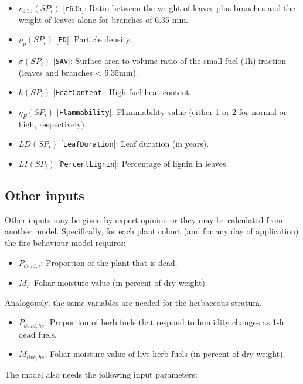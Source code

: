 \documentclass[]{book}
\providecommand{\tightlist}{%
  \setlength{\itemsep}{0pt}\setlength{\parskip}{0pt}}
\begin{document}
\begin{itemize}
\tightlist
\item
  \(r_{6.35}(SP_i)\) {[}\texttt{r635}{]}: Ratio between the weight of
  leaves plus branches and the weight of leaves alone for branches of
  6.35 mm.
\item
  \(\rho_p(SP_i)\) {[}\texttt{PD}{]}: Particle density.
\item
  \(\sigma(SP_i)\) {[}\texttt{SAV}{]}: Surface-area-to-volume ratio of
  the small fuel (1h) fraction (leaves and branches \textless{} 6.35mm).
\item
  \(h(SP_i)\) {[}\texttt{HeatContent}{]}: High fuel heat content.
\item
  \(\eta_{F}(SP_i)\) {[}\texttt{Flammability}{]}: Flammability value
  (either 1 or 2 for normal or high, respectively).
\item
  \(LD(SP_i)\) {[}\texttt{LeafDuration}{]}: Leaf duration (in years).
\item
  \(LI(SP_i)\) {[}\texttt{PercentLignin}{]}: Percentage of lignin in
  leaves.
\end{itemize}

\subsection{Other inputs}\label{other-inputs}

Other inputs may be given by expert opinion or they may be calculated
from another model. Specifically, for each plant cohort (and for any day
of application) the fire behaviour model requires:

\begin{itemize}
\tightlist
\item
  \(P_{dead,i}\): Proportion of the plant that is dead.
\item
  \(M_i\): Foliar moisture value (in percent of dry weight).
\end{itemize}

Analogously, the same variables are needed for the herbaceous stratum.

\begin{itemize}
\tightlist
\item
  \(P_{dead,he}\): Proportion of herb fuels that respond to humidity
  changes as 1-h dead fuels.
\item
  \(M_{live,he}\): Foliar moisture value of live herb fuels (in percent
  of dry weight).
\end{itemize}

The model also needs the following input parameters:
\end{document}
